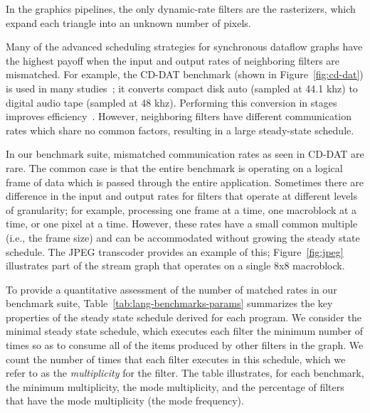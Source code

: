 In the graphics pipelines, the only dynamic-rate filters are the
rasterizers, which expand each triangle into an unknown number of
pixels.

\newpage
{}  Many of
  the advanced scheduling strategies for synchronous dataflow graphs
  have the highest payoff when the input and output rates of
  neighboring filters are mismatched.  For example, the CD-DAT
  benchmark (shown in Figure~\ref{fig:cd-dat}) is used in many
  studies~\cite{murthy_minimizing_1994,bhattacharyya_optimal_1995,teich_3d_1999,bhattacharya_quasi-static_2000,chandrachoodan_efficient_2001,murthy_buffer_2004,ko_memory-constrained_2006};
  it converts compact disk auto (sampled at 44.1 khz) to digital audio
  tape (sampled at 48 khz).  Performing this conversion in stages
  improves efficiency~\cite{murthy_minimizing_1994}.  However,
  neighboring filters have different communication rates which share
  no common factors, resulting in a large steady-state schedule.

  In our benchmark suite, mismatched communication rates as seen in
  CD-DAT are rare.  The common case is that the entire benchmark is
  operating on a logical frame of data which is passed through the
  entire application.  Sometimes there are difference in the input and
  output rates for filters that operate at different levels of
  granularity; for example, processing one frame at a time, one
  macroblock at a time, or one pixel at a time.  However, these rates
  have a small common multiple (i.e., the frame size) and can be
  accommodated without growing the steady state schedule.  The JPEG
  transcoder provides an example of this; Figure~\ref{fig:jpeg}
  illustrates part of the stream graph that operates on a single 8x8
  macroblock.

  To provide a quantitative assessment of the number of matched rates
  in our benchmark suite, Table~\ref{tab:lang-benchmarks-params}
  summarizes the key properties of the steady state schedule derived
  for each program.  We consider the minimal steady state schedule,
  which executes each filter the minimum number of times so as to
  consume all of the items produced by other filters in the graph.  We
  count the number of times that each filter executes in this
  schedule, which we refer to as the {\it multiplicity} for the
  filter.  The table illustrates, for each benchmark, the minimum
  multiplicity, the mode multiplicity, and the percentage of filters
  that have the mode multiplicity (the mode frequency).

